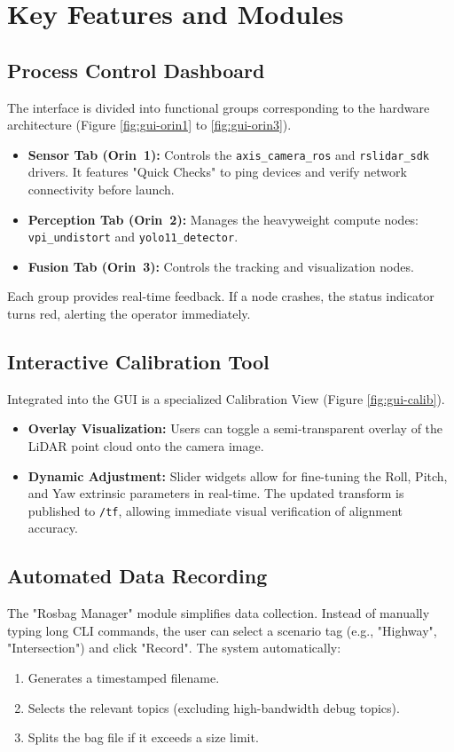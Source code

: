 \documentclass[12pt,a4paper]{report}
\begin{document}
\section{Key Features and Modules}

\subsection{Process Control Dashboard}
The interface is divided into functional groups corresponding to the hardware architecture (Figure \ref{fig:gui-orin1} to \ref{fig:gui-orin3}).
\begin{itemize}
    \item \textbf{Sensor Tab (Orin~1):} Controls the \texttt{axis\_camera\_ros} and \texttt{rslidar\_sdk} drivers. It features "Quick Checks" to ping devices and verify network connectivity before launch.
    \item \textbf{Perception Tab (Orin~2):} Manages the heavyweight compute nodes: \texttt{vpi\_undistort} and \texttt{yolo11\_detector}.
    \item \textbf{Fusion Tab (Orin~3):} Controls the tracking and visualization nodes.
\end{itemize}
Each group provides real-time feedback. If a node crashes, the status indicator turns red, alerting the operator immediately.

\subsection{Interactive Calibration Tool}
Integrated into the GUI is a specialized Calibration View (Figure \ref{fig:gui-calib}).
\begin{itemize}
    \item \textbf{Overlay Visualization:} Users can toggle a semi-transparent overlay of the LiDAR point cloud onto the camera image.
    \item \textbf{Dynamic Adjustment:} Slider widgets allow for fine-tuning the Roll, Pitch, and Yaw extrinsic parameters in real-time. The updated transform is published to \texttt{/tf}, allowing immediate visual verification of alignment accuracy.
\end{itemize}

\subsection{Automated Data Recording}
The "Rosbag Manager" module simplifies data collection. Instead of manually typing long CLI commands, the user can select a scenario tag (e.g., "Highway", "Intersection") and click "Record". The system automatically:
\begin{enumerate}
    \item Generates a timestamped filename.
    \item Selects the relevant topics (excluding high-bandwidth debug topics).
    \item Splits the bag file if it exceeds a size limit.
\end{enumerate}
\end{document}
